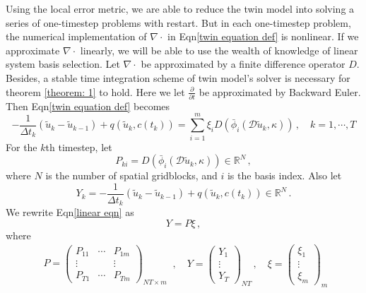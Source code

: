\documentclass[a4paper,onecolumn]{article}
\theoremstyle{remark}
\begin{document}
\noindent Using the local error metric, we are able to reduce the twin model
into solving a series of one-timestep problems with restart. But in each one-timestep
problem, the numerical implementation of $\nabla\cdot$ in Eqn\eqref{twin equation def}
is nonlinear. If we approximate $\nabla\cdot$ linearly, we will be able to 
use the wealth of knowledge of linear system basis selection. 
Let $\nabla\cdot$ be approximated by a
finite difference operator $D$. Besides,
a stable time integration scheme of twin model's solver is necessary 
for theorem \ref{theorem: 1} to hold. Here
we let $\frac{\partial}{\partial t}$ be approximated by Backward Euler. 
Then Eqn\eqref{twin equation def} becomes
\begin{equation}
    -\frac{1}{\Delta t_k}\left(\tilde{u}_{k} - \tilde{u}_{k-1}\right) +q(\tilde{u}_k,c(t_k))
    =
    \sum_{i=1}^m \xi_i D\left(\bar{\phi}_i(\mathcal{D}\tilde{u}_k, \kappa)\right)\,,
    \quad k=1,\cdots, T
    \label{linear eqn}
\end{equation}
For the $k$th timestep, let
\begin{equation}
    P_{ki} = D\left(\bar{\phi}_i(\mathcal{D}\tilde{u}_k, \kappa)\right) \in\mathbb{R}^N\,,
\end{equation}
where $N$ is the number of spatial gridblocks, and $i$ is the basis index. Also let
\begin{equation}
    Y_k = -\frac{1}{\Delta t_k}\left(\tilde{u}_{k} - \tilde{u}_{k-1}\right) +q(\tilde{u}_k,c(t_k))
\in\mathbb{R}^N\,.
\end{equation}
We rewrite Eqn\eqref{linear eqn} as
\begin{equation}
    Y = P\xi\,,
    \label{linear selection}
\end{equation}
where
\begin{equation}\begin{split}
    P = \begin{pmatrix}
        P_{11} & \cdots & P_{1m}\\
        \vdots &        & \vdots\\
        P_{T1} & \cdots & P_{Tm}
    \end{pmatrix}_{NT\times m}
\end{split}\,,    \quad
    Y = \begin{pmatrix}
        Y_1\\
        \vdots\\
        Y_T
    \end{pmatrix}_{NT}\,,\quad
    \xi = 
    \begin{pmatrix}
        \xi_1\\
        \vdots\\
        \xi_m
    \end{pmatrix}_{m}
\end{equation}
\end{document}
